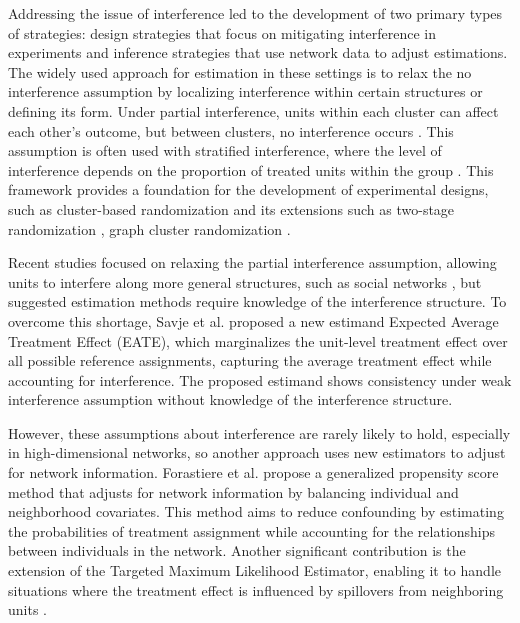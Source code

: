 \documentclass[a4paper,11pt]{article}
\begin{document}
Addressing the issue of interference led to the development of two primary types of strategies: design strategies that focus on mitigating interference in experiments and inference strategies that use network data to adjust estimations. The widely used approach for estimation in these settings is to relax the no interference assumption by localizing interference within certain structures or defining its form. Under partial interference, units within each cluster can affect each other's outcome, but between clusters, no interference occurs \cite{sobel2006randomized}. This assumption is often used with stratified interference, where the level of interference depends on the proportion of treated units within the group \cite{savje2021average}. This framework provides a foundation for the development of experimental designs, such as cluster-based randomization and its extensions such as two-stage randomization \cite{hudgens2008toward}, graph cluster randomization \cite{ugander2013graph}.

Recent studies focused on relaxing the partial interference assumption, allowing units to interfere along more general structures, such as social networks \cite{manski2013identification}, but suggested estimation methods require knowledge of the interference structure. To overcome this shortage, Savje et al. \citeyear{savje2021average} proposed a new estimand Expected Average Treatment Effect (EATE), which marginalizes the unit-level treatment effect over all possible reference assignments, capturing the average treatment effect while accounting for interference. The proposed estimand shows consistency under weak interference assumption without knowledge of the interference structure.

However, these assumptions about interference are rarely likely to hold, especially in high-dimensional networks, so another approach uses new estimators to adjust for network information. Forastiere et al. \citeyear{forastiere2021identification} propose a generalized propensity score method that adjusts for network information by balancing individual and neighborhood covariates. This method aims to reduce confounding by estimating the probabilities of treatment assignment while accounting for the relationships between individuals in the network. Another significant contribution is the extension of the Targeted Maximum Likelihood Estimator, enabling it to handle situations where the treatment effect is influenced by spillovers from neighboring units \cite{ogburn2024causal}.
\end{document}

